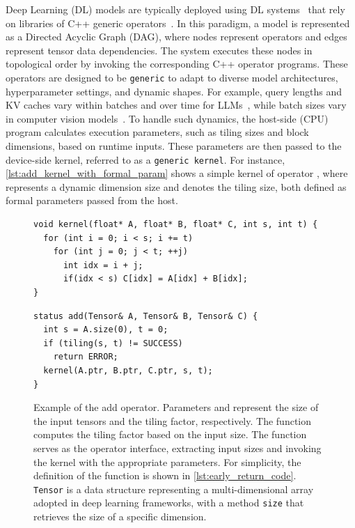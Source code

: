 Deep Learning (DL) models are typically deployed using DL systems~\cite{ansel2024dynamo,abadi2016tensorflow,kwon2023vllm,zheng2024sglang} that rely on libraries of C++ generic operators~\cite{nvidia2021cublas,nvidia2017cutlass,ye2025flashinfer,HuaweiCANN}. 
In this paradigm, a model is represented as a Directed Acyclic Graph (DAG), where nodes represent operators and edges represent tensor data dependencies. 
The system executes these nodes in topological order by invoking the corresponding C++ operator programs.
These operators are designed to be \texttt{generic} to adapt to diverse model architectures, hyperparameter settings, and dynamic shapes. 
For example, query lengths and KV caches vary within batches and over time for LLMs~\cite{vaswani2017attention,yang2024qwen2technicalreport,touvron2023llama2openfoundation}, while batch sizes vary in computer vision models~\cite{he2016resnet,redmon2018yolov3}.
To handle such dynamics, the host-side (CPU) program calculates execution parameters, such as tiling sizes and block dimensions, based on runtime inputs. 
These parameters are then passed to the device-side kernel, referred to as a \texttt{generic kernel}. 
For instance, \autoref{lst:add_kernel_with_formal_param} shows a simple kernel of operator , where  represents a dynamic dimension size and  denotes the tiling size, both defined as formal parameters passed from the host.

\begin{figure}[htbp]
    \centering
    \begin{minipage}{0.48\textwidth}
    \begin{lstlisting}[basicstyle=\ttfamily\footnotesize, frame=single]
void kernel(float* A, float* B, float* C, int s, int t) {
  for (int i = 0; i < s; i += t)
    for (int j = 0; j < t; ++j)
      int idx = i + j;
      if(idx < s) C[idx] = A[idx] + B[idx];
}
    \end{lstlisting}
    \end{minipage}
\hfill
    \begin{minipage}{0.48\textwidth}
    \begin{lstlisting}[basicstyle=\ttfamily\footnotesize, frame=single, firstnumber=7]
status add(Tensor& A, Tensor& B, Tensor& C) {
  int s = A.size(0), t = 0;
  if (tiling(s, t) != SUCCESS) 
    return ERROR;
  kernel(A.ptr, B.ptr, C.ptr, s, t);
}
    \end{lstlisting}
    \end{minipage}
    \caption{Example of the add operator. Parameters  and  represent the size of the input tensors and the tiling factor, respectively. 
    The  function computes the tiling factor based on the input size. 
    The  function serves as the operator interface, extracting input sizes and invoking the kernel with the appropriate parameters. 
    For simplicity, the definition of the  function is shown in \autoref{lst:early_return_code}. 
    \texttt{Tensor} is a data structure representing a multi-dimensional array adopted in deep learning frameworks, with a method \texttt{size} that retrieves the size of a specific dimension.}
    \Description{}
    \label{lst:add_kernel_with_formal_param}
\end{figure}

